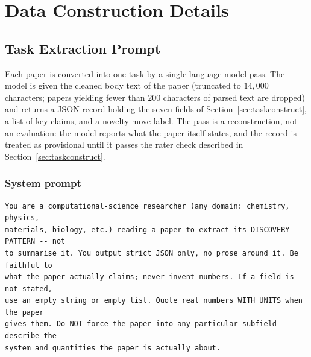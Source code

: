 \UseRawInputEncoding

\section{Data Construction Details}
\label{app:extraction}
\subsection{Task Extraction Prompt}

%




Each paper is converted into one task by a single language-model pass. The model is given the
cleaned body text of the paper (truncated to $14{,}000$ characters; papers yielding fewer than
$200$ characters of parsed text are dropped) and returns a JSON record holding the seven fields
of Section~\ref{sec:taskconstruct}, a list of key claims, and a novelty-move label. The pass is
a reconstruction, not an evaluation: the model reports what the paper itself states, and the
record is treated as provisional until it passes the rater check described in
Section~\ref{sec:taskconstruct}.

\subsubsection{System prompt}

\begin{lstlisting}[style=prompt]
You are a computational-science researcher (any domain: chemistry, physics,
materials, biology, etc.) reading a paper to extract its DISCOVERY PATTERN -- not
to summarise it. You output strict JSON only, no prose around it. Be faithful to
what the paper actually claims; never invent numbers. If a field is not stated,
use an empty string or empty list. Quote real numbers WITH UNITS when the paper
gives them. Do NOT force the paper into any particular subfield -- describe the
system and quantities the paper is actually about.
\end{lstlisting}

